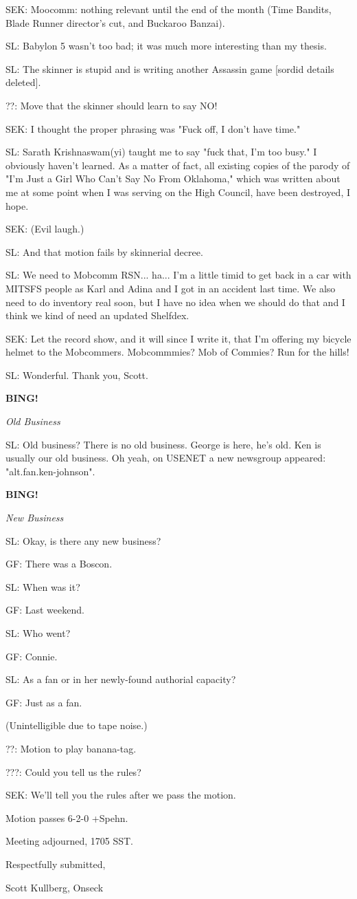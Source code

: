 \documentclass[12pt]{article}
\newcommand{\bing}{{\bf BING!} }
\newcommand{\goto}[1]{\bing \vskip 12pt \centerline{{\em{#1}}}}
\begin{document}
SEK: Moocomm: nothing relevant until the end of the month (Time Bandits, Blade Runner director's cut, and Buckaroo Banzai).

SL: Babylon 5 wasn't too bad; it was much more interesting than my thesis.

SL: The skinner is stupid and is writing another Assassin game [sordid details deleted].

??: Move that the skinner should learn to say NO!

SEK: I thought the proper phrasing was "Fuck off, I don't have time."

SL: Sarath Krishnaswam(yi) taught me to say "fuck that, I'm too busy." I obviously haven't learned. As a matter of fact, all existing copies of the parody of "I'm Just a Girl Who Can't Say No From Oklahoma," which was written about me at some point when I was serving on the High Council, have been destroyed, I hope.

SEK: (Evil laugh.)

SL: And that motion fails by skinnerial decree.

SL: We need to Mobcomm RSN... ha... I'm a little timid to get back in a car with MITSFS people as Karl and Adina and I got in an accident last time. We also need to do inventory real soon, but I have no idea when we should do that and I think we kind of need an updated Shelfdex.

SEK: Let the record show, and it will since I write it, that I'm offering my bicycle helmet to the Mobcommers. Mobcommmies? Mob of Commies? Run for the hills!

SL: Wonderful. Thank you, Scott.

\goto{Old Business}

SL: Old business? There is no old business. George is here, he's old. Ken is usually our old business. Oh yeah, on USENET a new newsgroup appeared: "alt.fan.ken-johnson".

\goto{New Business}

SL: Okay, is there any new business?

GF: There was a Boscon.

SL: When was it?

GF: Last weekend.

SL: Who went?

GF: Connie.

SL: As a fan or in her newly-found authorial capacity?

GF: Just as a fan.

(Unintelligible due to tape noise.)

??: Motion to play banana-tag.

???: Could you tell us the rules?

SEK: We'll tell you the rules after we pass the motion.

Motion passes 6-2-0 +Spehn.

\vspace{12pt}

\noindent
Meeting adjourned, 1705 SST.

\vspace{18pt}

\centerline{Respectfully submitted,}
\centerline{Scott Kullberg, Onseck}
\end{document}
